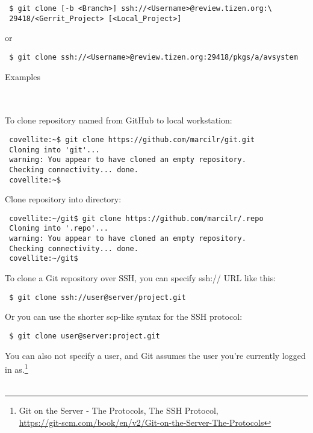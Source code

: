 \begin{Verbatim}
 $ git clone [-b <Branch>] ssh://<Username>@review.tizen.org:\
 29418/<Gerrit_Project> [<Local_Project>]
\end{Verbatim}

or

\begin{Verbatim}
 $ git clone ssh://<Username>@review.tizen.org:29418/pkgs/a/avsystem
\end{Verbatim}

\vspace{20pt}
\noindent\begin{bf}Examples\end{bf}
\\
\\
To clone repository named  from GitHub to local  workstation:
\begin{Verbatim}
 covellite:~$ git clone https://github.com/marcilr/git.git
 Cloning into 'git'...
 warning: You appear to have cloned an empty repository.
 Checking connectivity... done.
 covellite:~$
\end{Verbatim}

\noindent Clone  repository into  directory:
\begin{Verbatim}
 covellite:~/git$ git clone https://github.com/marcilr/.repo
 Cloning into '.repo'...
 warning: You appear to have cloned an empty repository.
 Checking connectivity... done.
 covellite:~/git$
\end{Verbatim}


\newpage
\noindent To clone a Git repository over SSH, you can specify ssh:// URL like this:\\
\begin{Verbatim}
 $ git clone ssh://user@server/project.git
\end{Verbatim}

\noindent Or you can use the shorter scp-like syntax for the SSH protocol:

\begin{Verbatim}
 $ git clone user@server:project.git
\end{Verbatim}

\noindent You can also not specify a user, and Git assumes the user
you're currently logged in as.\footnote{
Git on the Server - The Protocols, The SSH Protocol,\\
\href{https://git-scm.com/book/en/v2/Git-on-the-Server-The-Protocols}{https://git-scm.com/book/en/v2/Git-on-the-Server-The-Protocols}}
\\
\\
\noindent {}
